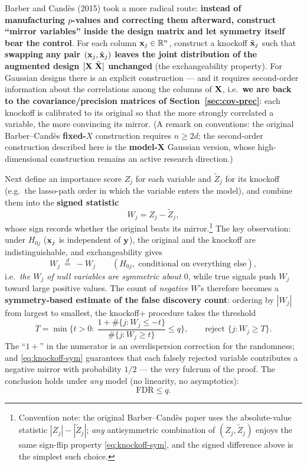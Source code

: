 Barber and Candès (2015) took a more radical route\cite{barber2015}: \textbf{instead of manufacturing $p$-values and correcting them afterward, construct ``mirror variables'' inside the design matrix and let symmetry itself bear the control}. For each column $\mathbf{x}_j \in \mathbb{R}^n$, construct a knockoff $\tilde{\mathbf{x}}_j$ such that \textbf{swapping any pair $(\mathbf{x}_j, \tilde{\mathbf{x}}_j)$ leaves the joint distribution of the augmented design $[\mathbf{X}\ \tilde{\mathbf{X}}]$ unchanged} (the exchangeability property). For Gaussian designs there is an explicit construction — and it requires second-order information about the correlations among the columns of $\mathbf{X}$, i.e.\ \textbf{we are back to the covariance/precision matrices of Section~\ref{sec:cov-prec}}: each knockoff is calibrated to its original so that the more strongly correlated a variable, the more convincing its mirror. (A remark on conventions: the original Barber--Candès \textbf{fixed-$X$} construction requires $n \ge 2d$; the second-order construction described here is the \textbf{model-X} Gaussian version, whose high-dimensional construction remains an active research direction.)

Next define an importance score $Z_j$ for each variable and $\tilde{Z}_j$ for its knockoff (e.g.\ the lasso-path order in which the variable enters the model), and combine them into the \textbf{signed statistic}
\[
  W_j = Z_j - \tilde{Z}_j ,
\]
whose sign records whether the original beats its mirror.\footnote{Convention note: the original Barber--Cand\`es paper uses the absolute-value statistic $|Z_j| - |\tilde{Z}_j|$; \emph{any} antisymmetric combination of $(Z_j, \tilde{Z}_j)$ enjoys the same sign-flip property \eqref{eq:knockoff-sym}, and the signed difference above is the simplest such choice.} The key observation: under $H_{0j}$ ($\mathbf{x}_j$ is independent of $\mathbf{y}$), the original and the knockoff are indistinguishable, and exchangeability gives
\begin{equation}\label{eq:knockoff-sym}
  W_j \ \overset{d}{=}\ -W_j
  \qquad (H_{0j}, \text{ conditional on everything else}),
\end{equation}
i.e.\ \emph{the $W_j$ of null variables are symmetric about $0$}, while true signals push $W_j$ toward large positive values. The count of \emph{negative} $W$'s therefore becomes a \textbf{symmetry-based estimate of the false discovery count}: ordering by $|W_j|$ from largest to smallest, the knockoff+ procedure takes the threshold
\begin{equation}\label{eq:knockoff}
  T = \min\Big\{ t > 0 :\ \frac{ 1 + \#\{ j : W_j \le -t \} }{ \#\{ j : W_j \ge t \} } \le q \Big\},
  \qquad
  \text{reject } \{ j : W_j \ge T \}.
\end{equation}
The ``$1+$'' in the numerator is an overdispersion correction for the randomness; and \eqref{eq:knockoff-sym} guarantees that each falsely rejected variable contributes a negative mirror with probability $1/2$ — the very fulcrum of the proof. The conclusion holds under \emph{any} model (no linearity, no asymptotics):
\[
  \mathrm{FDR} \le q .
\]

